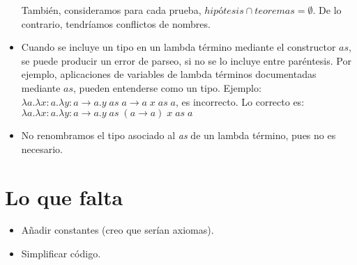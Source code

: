 \documentclass[a4paper,11pt]{article}
\begin{document}
\begin{itemize}
  También, consideramos para cada prueba, $hipótesis \cap teoremas = \emptyset$. De lo contrario, tendríamos conflictos de nombres.
  
  \item Cuando se incluye un tipo en un lambda término mediante el constructor $as$, se puede producir un error de parseo, si no se lo
  incluye entre paréntesis. Por ejemplo, aplicaciones de variables de lambda términos documentadas mediante $as$, pueden entenderse
  como un tipo. Ejemplo: $\lambda a.\lambda x:a. \lambda y:a \rightarrow a. y \; as \; a \rightarrow a \; x \; as \; a$,
  es incorrecto. Lo correcto es: $\lambda a.\lambda x:a. \lambda y:a \rightarrow a. y \; as \; (a \rightarrow a) \; x \; as \; a$
  
  \item No renombramos el tipo asociado al \textit{as} de un lambda término, pues no es necesario.
  

\end{itemize}

\section{Lo que falta}
\begin{itemize}
%   
  \item Añadir constantes (creo que serían axiomas).
  
  \item Simplificar código.
\end{itemize}
\end{document}
